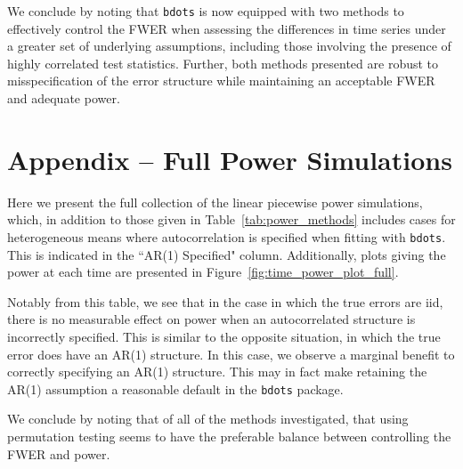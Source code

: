 \documentclass{article}
\newcommand{\xt}{\texttt}
\begin{document}
We conclude by noting that \xt{bdots} is now equipped with two methods to effectively control the FWER when assessing the differences in time series under a greater set of underlying assumptions, including those involving the presence of highly correlated test statistics. Further, both methods presented are robust to misspecification of the error structure while maintaining an acceptable FWER and adequate power. 

\section{Appendix -- Full Power Simulations}

Here we present the full collection of the linear piecewise power simulations, which, in addition to those given in Table~\ref{tab:power_methods} includes cases for heterogeneous means where autocorrelation is specified when fitting with \xt{bdots}. This is indicated in the ``AR(1) Specified" column. Additionally, plots giving the power at each time are presented in Figure~\ref{fig:time_power_plot_full}.

Notably from this table, we see that in the case in which the true errors are iid, there is no measurable effect on power when an autocorrelated structure is incorrectly specified.  This is similar to the opposite situation, in which the true error does have an AR(1) structure. In this case, we observe a marginal benefit to correctly specifying an AR(1) structure. This may in fact make retaining the AR(1) assumption a reasonable default in the \xt{bdots} package.

We conclude by noting that of all of the methods investigated, that using permutation testing seems to have the preferable balance between controlling the FWER and power. 
\end{document}
